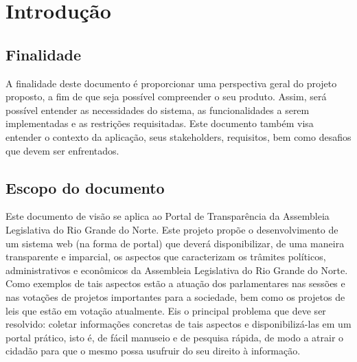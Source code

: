 \documentclass[12pt, a4paper]{article}
\begin{document}
    \newpage

    \tableofcontents

    \newpage

    \section{Introdução}
        \subsection{Finalidade}
        A finalidade deste documento é proporcionar uma perspectiva geral do
        projeto proposto, a fim de que seja possível compreender o seu produto.
        Assim, será possível entender as necessidades do sistema, as
        funcionalidades a serem implementadas e as restrições requisitadas.
        Este documento também visa entender o contexto da aplicação, seus
        stakeholders, requisitos, bem como desafios que devem ser enfrentados.

        \subsection{Escopo do documento}
        Este documento de visão se aplica ao Portal de Transparência da
        Assembleia Legislativa do Rio Grande do Norte. Este projeto propõe
        o desenvolvimento de um sistema web (na forma de portal) que deverá
        disponibilizar, de uma maneira transparente e imparcial, os aspectos
        que caracterizam os trâmites políticos, administrativos e econômicos da
        Assembleia Legislativa do Rio Grande do Norte.  Como exemplos de tais
        aspectos estão a atuação dos parlamentares nas sessões e nas votações
        de projetos importantes para a sociedade, bem como os projetos de leis
        que estão em votação atualmente. Eis o principal problema que deve ser
        resolvido: coletar informações concretas de tais aspectos e
        disponibilizá-las em um portal prático, isto é, de fácil manuseio e de
        pesquisa rápida, de modo a atrair o cidadão para que o mesmo possa
        usufruir do seu direito à informação.
\end{document}
